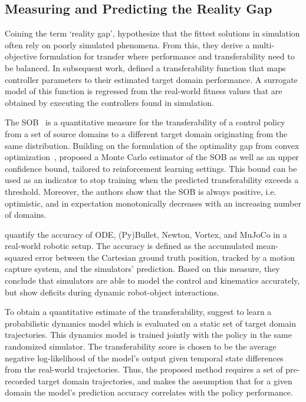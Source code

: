 \documentclass[utf8]{frontiersSCNS} %
\begin{document}
\subsection{Measuring and Predicting the Reality Gap}
\label{sec_sota_measureing_sim2real_transferability}
Coining the term \enquote*{reality gap}, \citet{Koos_Doncieux_10} hypothesize that the fittest solutions in simulation often rely on poorly simulated phenomena.
From this, they derive a multi-objective
formulation for \simtoreal transfer where performance and transferability need to be balanced.
In subsequent work, \citet{Koos_Doncieux_13} defined a transferability function that maps controller parameters to their estimated target domain performance.
A surrogate model of this function is regressed from the real-world fitness values that are obtained by executing the controllers found in simulation.

The \ac{SOB}~\citep{Muratore_Peters_18_CoRL,Muratore_Peters_21_PAMI} is a quantitative measure for the transferability of a control policy from a set of source domains to a different target domain originating from the same distribution.
Building on the formulation of the optimality gap from convex optimization~\citep{Mak_etal_1999,Bayraksan_Morton_2006}, \citet{Muratore_Peters_18_CoRL} proposed a Monte Carlo estimator of the \ac{SOB} as well as an upper confidence bound, tailored to reinforcement learning settings.
This bound can be used as an indicator to stop training when the predicted transferability exceeds a threshold.
Moreover, the authors show that the \ac{SOB} is always positive, i.e. optimistic, and in expectation monotonically decreases with an increasing number of domains. 

\citet{Collins_Leitner_19} quantify the accuracy of ODE, (Py)Bullet, Newton, Vortex, and MuJoCo in a real-world robotic setup.
The accuracy is defined as the accumulated mean-squared error between the Cartesian ground truth position, tracked by a motion capture system, and the simulators' prediction.
Based on this measure, they conclude that simulators are able to model the control and kinematics accurately, but show deficits during dynamic robot-object interactions.

To obtain a quantitative estimate of the transferability, \citet{Zhang_Zaremba_20} suggest to learn a probabilistic dynamics model which is evaluated on a static set of target domain trajectories.
This dynamics model is trained jointly with the policy in the same randomized simulator.
The transferability score is chosen to be the average negative log-likelihood of the model's output given temporal state differences from the real-world trajectories.
Thus, the proposed method requires a set of pre-recorded target domain trajectories, and makes the assumption that for a given domain the model's prediction accuracy correlates with the policy performance.
\end{document}
